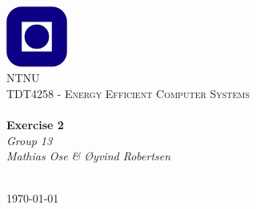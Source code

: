 \begin{titlepage}
\begin{center}
\includegraphics[width=0.15\textwidth]{img/ntnulogo.PNG}~\\[1cm]

\textsc{\LARGE NTNU}\\[1.5cm]

\textsc{\Large TDT4258 - Energy Efficient Computer Systems}\\[0.5cm]

\HRule \\[0.4cm]
{ \huge \bfseries Exercise 2}\\[0.5cm]
{\Large \textit{Group 13}}\\[0.3cm]
{\large \textit{Mathias Ose  \& \O yvind Robertsen}}\\[0.2cm]
\HRule \\[1.5cm]



\vfill

{\large \today}
\end{center}
\end{titlepage}
